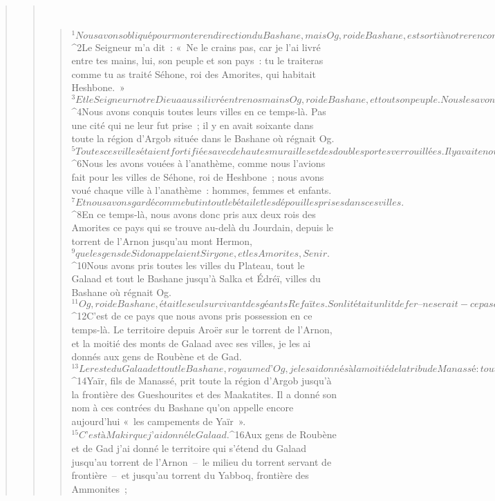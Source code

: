 \begin{verse}
\begin{verse}
         
      \bchapter{}
      \begin{verse}
${}^{1}Nous avons obliqué pour monter en direction du Bashane, mais Og, roi de Bashane, est sorti à notre rencontre, lui et tout son peuple, pour combattre à Édréï.
${}^{2}Le Seigneur m’a dit : « Ne le crains pas, car je l’ai livré entre tes mains, lui, son peuple et son pays : tu le traiteras comme tu as traité Séhone, roi des Amorites, qui habitait Heshbone. » 
${}^{3}Et le Seigneur notre Dieu a aussi livré entre nos mains Og, roi de Bashane, et tout son peuple. Nous les avons battus sans leur laisser aucun survivant. 
${}^{4}Nous avons conquis toutes leurs villes en ce temps-là. Pas une cité qui ne leur fut prise ; il y en avait soixante dans toute la région d’Argob située dans le Bashane où régnait Og. 
${}^{5}Toutes ces villes étaient fortifiées avec de hautes murailles et des doubles portes verrouillées. Il y avait en outre un très grand nombre de villages. 
${}^{6}Nous les avons vouées à l’anathème, comme nous l’avions fait pour les villes de Séhone, roi de Heshbone ; nous avons voué chaque ville à l’anathème : hommes, femmes et enfants. 
${}^{7}Et nous avons gardé comme butin tout le bétail et les dépouilles prises dans ces villes.
${}^{8}En ce temps-là, nous avons donc pris aux deux rois des Amorites ce pays qui se trouve au-delà du Jourdain, depuis le torrent de l’Arnon jusqu’au mont Hermon, 
${}^{9}que les gens de Sidon appelaient Siryone, et les Amorites, Senir. 
${}^{10}Nous avons pris toutes les villes du Plateau, tout le Galaad et tout le Bashane jusqu’à Salka et Édréï, villes du Bashane où régnait Og. 
${}^{11}Og, roi de Bashane, était le seul survivant des géants Refaïtes. Son lit était un lit de fer – ne serait-ce pas celui qu’on voit à Rabba des Ammonites ? – un lit qui fait bien neuf coudées de long et quatre coudées de large.
${}^{12}C’est de ce pays que nous avons pris possession en ce temps-là. Le territoire depuis Aroër sur le torrent de l’Arnon, et la moitié des monts de Galaad avec ses villes, je les ai donnés aux gens de Roubène et de Gad. 
${}^{13}Le reste du Galaad et tout le Bashane, royaume d’Og, je les ai donnés à la moitié de la tribu de Manassé : toute la région de l’Argob et tout le Bashane qu’on appelle le pays des Refaïtes. 
${}^{14}Yaïr, fils de Manassé, prit toute la région d’Argob jusqu’à la frontière des Gueshourites et des Maakatites. Il a donné son nom à ces contrées du Bashane qu’on appelle encore aujourd’hui « les campements de Yaïr ». 
${}^{15}C’est à Makir que j’ai donné le Galaad. 
${}^{16}Aux gens de Roubène et de Gad j’ai donné le territoire qui s’étend du Galaad jusqu’au torrent de l’Arnon – le milieu du torrent servant de frontière – et jusqu’au torrent du Yabboq, frontière des Ammonites ; 

\end{verse}
\end{verse}
\end{verse}
